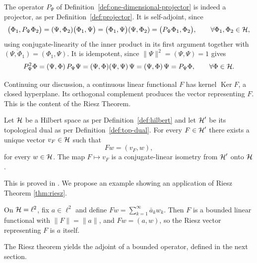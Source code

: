 \begin{remark}
	The operator $P_\Psi$ of Definition~\ref{def:one-dimensional-projector} is indeed a projector, as per Definition~\ref{def:projector}. It is self-adjoint, since
	\begin{equation}
		\big(\Phi_1,P_\Psi\Phi_2\big) = (\Psi,\Phi_2)\big(\Phi_1,\Psi\big) = \big(\Phi_1,\Psi\big)(\Psi,\Phi_2) = \big(P_\Psi\Phi_1,\Phi_2\big), \qquad \forall \Phi_1,\Phi_2 \in \H,
	\end{equation}
	using conjugate-linearity of the inner product in its first argument together with $\overline{(\Psi,\Phi_1)} = (\Phi_1,\Psi)$. It is idempotent, since $\|\Psi\|^2=(\Psi,\Psi)=1$ gives
	\begin{equation}
		P_\Psi^2\Phi = (\Psi,\Phi)\,P_\Psi\Psi = (\Psi,\Phi)(\Psi,\Psi)\,\Psi = (\Psi,\Phi)\,\Psi = P_\Psi\Phi, \qquad \forall \Phi \in \H.
	\end{equation}
\end{remark}

\noindent Continuing our discussion, a continuous linear functional $F$ has kernel $\operatorname{Ker}F$, a closed hyperplane. Its orthogonal complement produces the vector representing $F$. This is the content of the Riesz Theorem.

\begin{theorem}\label{thm:riesz}
	Let $\H$ be a Hilbert space as per Definition~\ref{def:hilbert} and let $\H'$ be its topological dual as per Definition~\ref{def:top-dual}. For every $F\in\H'$ there exists a unique vector $v_F\in\H$ such that
	\begin{equation}
		Fw=( v_F,w),
	\end{equation}
	for every $w\in\H$. The map $F\mapsto v_F$ is a conjugate-linear isometry from $\H'$ onto $\H$.
\end{theorem}

\noindent This is proved in \cite[Theorem 3.16]{morettiSpectralTheoryQuantum}. We propose an example showing an application of Riesz Theorem \ref{thm:riesz}.

\begin{example}\label{ex:riesz-l2}
	On $\H=\ell^2$, fix $a\in\ell^2$ and define $Fw=\sum_{k=1}^{\infty}\bar a_kw_k$. Then $F$ is a bounded linear functional with $\|F\|=\|a\|$, and $Fw=( a,w)$, so the Riesz vector representing $F$ is $a$ itself.
\end{example}

\noindent The Riesz theorem yields the adjoint of a bounded operator, defined in the next section.

